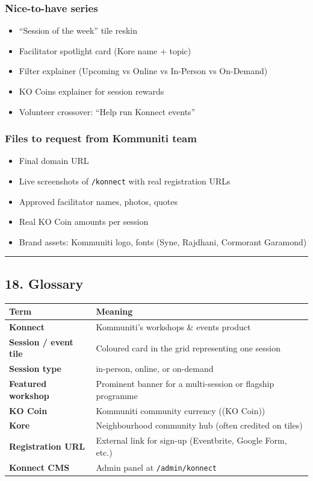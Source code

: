 \documentclass[11pt,a4paper]{report}
\begin{document}
\subsubsection{Nice-to-have series}
\begin{itemize}
  \item [ ] “Session of the week” tile reskin
  \item [ ] Facilitator spotlight card (Kore name + topic)
  \item [ ] Filter explainer (Upcoming vs Online vs In-Person vs On-Demand)
  \item [ ] KO Coins explainer for session rewards
  \item [ ] Volunteer crossover: “Help run Konnect events”
\end{itemize}

\subsubsection{Files to request from Kommuniti team}
\begin{itemize}
  \item [ ] Final domain URL
  \item [ ] Live screenshots of \texttt{/konnect} with real registration URLs
  \item [ ] Approved facilitator names, photos, quotes
  \item [ ] Real KO Coin amounts per session
  \item [ ] Brand assets: Kommuniti logo, fonts (Syne, Rajdhani, Cormorant Garamond)
\end{itemize}

\medskip\hrule\medskip

\subsection{18. Glossary}

\begin{longtable}{|l|l|}
\hline
Term & Meaning \\ \hline
\textbf{Konnect} & Kommuniti’s workshops \& events product \\ \hline
\textbf{Session / event tile} & Coloured card in the grid representing one session \\ \hline
\textbf{Session type} & in-person, online, or on-demand \\ \hline
\textbf{Featured workshop} & Prominent banner for a multi-session or flagship programme \\ \hline
\textbf{KO Coin} & Kommuniti community currency ((KO Coin)) \\ \hline
\textbf{Kore} & Neighbourhood community hub (often credited on tiles) \\ \hline
\textbf{Registration URL} & External link for sign-up (Eventbrite, Google Form, etc.) \\ \hline
\textbf{Konnect CMS} & Admin panel at \texttt{/admin/konnect} \\
\hline
\end{longtable}
\end{document}
